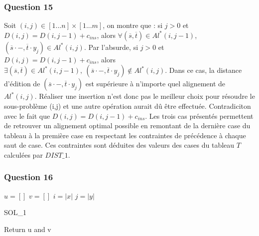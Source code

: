 \documentclass[12pt, a4paper]{report}
\begin{document}
\subsubsection{Question 15}
Soit $(i,j) \in \left[1...n\right] \times \left[1...m\right]$, on montre que : si $j>0$ et $D(i,j)=D(i,j-1)+c_{ins}$, alors $\forall (\overline{s},\overline{t}) \in Al^{*}(i,j-1)$, $(\overline{s}\cdot -,\overline{t} \cdot y_{j}) \in Al^{*}(i,j)$. Par l'absurde, si  $j>0$ et $D(i,j)=D(i,j-1)+c_{ins}$, alors $\exists (\overline{s},\overline{t}) \in Al^{*}(i,j-1),\ (\overline{s}\cdot -, \overline{t} \cdot y_{j}) \notin Al^{*}(i,j)$. Dans ce cas, la distance d'édition de $(\overline{s}\cdot -, \overline{t} \cdot y_{j})$ est supérieure à n'importe quel alignement de $Al^{*}(i,j)$. Réaliser une insertion n'est donc pas le meilleur choix pour résoudre le sous-problème (i,j) et une autre opération aurait dû être effectuée. Contradiciton avec le fait que $D(i,j)=D(i,j-1)+c_{ins}$.
Les trois cas présentés permettent de retrouver un alignement optimal possible en remontant de la dernière case du tableau à la première case en respectant les contraintes de précédence à chaque saut de case. Ces contraintes sont déduites des valeurs des cases du tableau $T$ calculées par $DIST\_1$.
\subsubsection{Question 16}
\begin{algorithm}[H]
\SetAlgoLined
{}
$u=\left[\right]$\;
$v=\left[\right]$\;
$i=|x|$\;
$j=|y|$\;
\caption{SOL\_1}
Return u and v\;
\end{algorithm}
\end{document}
